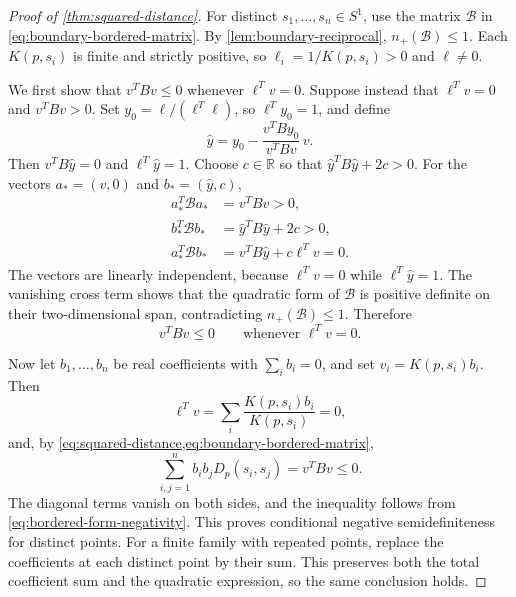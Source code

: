 \begin{proof}[Proof of \cref{thm:squared-distance}]
For distinct $s_1,\ldots,s_n\in S^1$, use the matrix
$\mathcal B$ in \eqref{eq:boundary-bordered-matrix}.
By \cref{lem:boundary-reciprocal}, $n_+(\mathcal B)\le1$.
Each $K(p,s_i)$ is finite and strictly positive, so
$\ell_i=1/K(p,s_i)>0$ and $\ell\ne0$.

We first show that $v^TBv\le0$ whenever $\ell^Tv=0$.
Suppose instead that $\ell^Tv=0$ and $v^TBv>0$.
Set $y_0=\ell/(\ell^T\ell)$, so $\ell^Ty_0=1$, and define
\[
 \widehat y=y_0-\frac{v^TBy_0}{v^TBv}\,v.
\]
Then $v^TB\widehat y=0$ and $\ell^T\widehat y=1$.
Choose $c\in\mathbb R$ so that $\widehat y^TB\widehat y+2c>0$.
For the vectors $a_*=(v,0)$ and $b_*=(\widehat y,c)$,
\[
 \begin{aligned}
 a_*^T\mathcal B a_*&=v^TBv>0,\\
 b_*^T\mathcal B b_*&=\widehat y^TB\widehat y+2c>0,\\
 a_*^T\mathcal B b_*&=v^TB\widehat y+c\ell^Tv=0.
 \end{aligned}
\]
The vectors are linearly independent, because $\ell^Tv=0$ while
$\ell^T\widehat y=1$. The vanishing cross term shows that the
quadratic form of $\mathcal B$ is positive definite on their
two-dimensional span, contradicting $n_+(\mathcal B)\le1$.
Therefore
\begin{equation}\label{eq:bordered-form-negativity}
 v^TBv\le0\qquad\text{whenever }\ell^Tv=0.
\end{equation}

Now let $b_1,\ldots,b_n$ be real coefficients with $\sum_i b_i=0$,
and set $v_i=K(p,s_i)b_i$. Then
\[
 \ell^Tv=\sum_i\frac{K(p,s_i)b_i}{K(p,s_i)}=0,
\]
and, by \cref{eq:squared-distance,eq:boundary-bordered-matrix},
\[
 \sum_{i,j=1}^n b_i b_j D_p(s_i,s_j)=v^TBv\le0.
\]
The diagonal terms vanish on both sides, and the inequality follows
from \eqref{eq:bordered-form-negativity}. This proves conditional
negative semidefiniteness for distinct points. For a finite family
with repeated points, replace the coefficients at each distinct
point by their sum. This preserves both the total coefficient sum
and the quadratic expression, so the same conclusion holds.
\end{proof}

